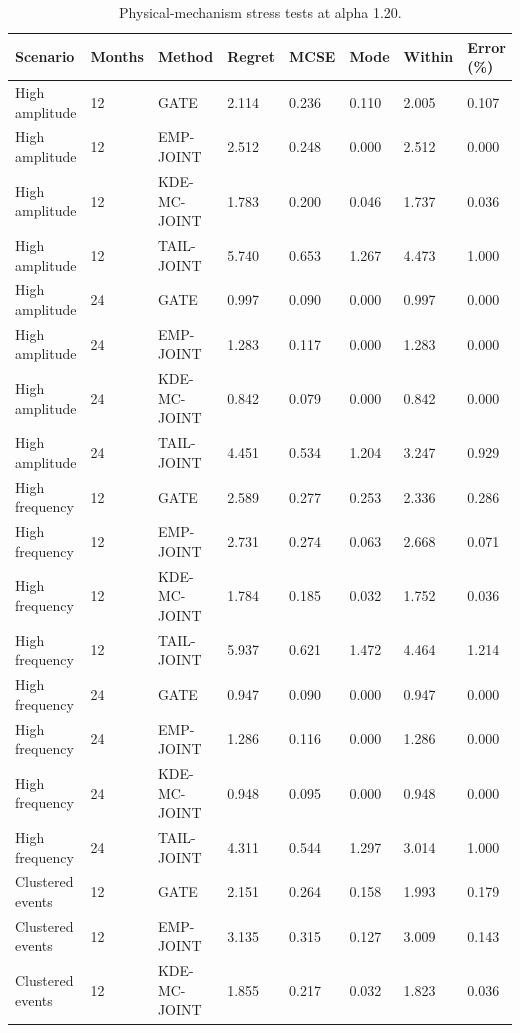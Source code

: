 \begingroup
\fontsize{8.5}{10.5}\selectfont\setlength{\tabcolsep}{3.0pt}\renewcommand{\arraystretch}{1.23}
\begin{table}[tbp]\centering
\caption{Physical-mechanism stress tests at alpha 1.20.}\label{tab:si-s6-updated}
\begin{tabular}{@{}llllllll@{}}\toprule
Scenario & Months & Method & Regret & MCSE & Mode & Within & Error (\%)\\\midrule
High amplitude & 12 & GATE & 2.114 & 0.236 & 0.110 & 2.005 & 0.107\\
High amplitude & 12 & EMP-JOINT & 2.512 & 0.248 & 0.000 & 2.512 & 0.000\\
High amplitude & 12 & KDE-MC-JOINT & 1.783 & 0.200 & 0.046 & 1.737 & 0.036\\
High amplitude & 12 & TAIL-JOINT & 5.740 & 0.653 & 1.267 & 4.473 & 1.000\\
High amplitude & 24 & GATE & 0.997 & 0.090 & 0.000 & 0.997 & 0.000\\
High amplitude & 24 & EMP-JOINT & 1.283 & 0.117 & 0.000 & 1.283 & 0.000\\
High amplitude & 24 & KDE-MC-JOINT & 0.842 & 0.079 & 0.000 & 0.842 & 0.000\\
High amplitude & 24 & TAIL-JOINT & 4.451 & 0.534 & 1.204 & 3.247 & 0.929\\
High frequency & 12 & GATE & 2.589 & 0.277 & 0.253 & 2.336 & 0.286\\
High frequency & 12 & EMP-JOINT & 2.731 & 0.274 & 0.063 & 2.668 & 0.071\\
High frequency & 12 & KDE-MC-JOINT & 1.784 & 0.185 & 0.032 & 1.752 & 0.036\\
High frequency & 12 & TAIL-JOINT & 5.937 & 0.621 & 1.472 & 4.464 & 1.214\\
High frequency & 24 & GATE & 0.947 & 0.090 & 0.000 & 0.947 & 0.000\\
High frequency & 24 & EMP-JOINT & 1.286 & 0.116 & 0.000 & 1.286 & 0.000\\
High frequency & 24 & KDE-MC-JOINT & 0.948 & 0.095 & 0.000 & 0.948 & 0.000\\
High frequency & 24 & TAIL-JOINT & 4.311 & 0.544 & 1.297 & 3.014 & 1.000\\
Clustered events & 12 & GATE & 2.151 & 0.264 & 0.158 & 1.993 & 0.179\\
Clustered events & 12 & EMP-JOINT & 3.135 & 0.315 & 0.127 & 3.009 & 0.143\\
Clustered events & 12 & KDE-MC-JOINT & 1.855 & 0.217 & 0.032 & 1.823 & 0.036\\

\end{tabular}
\end{table}
